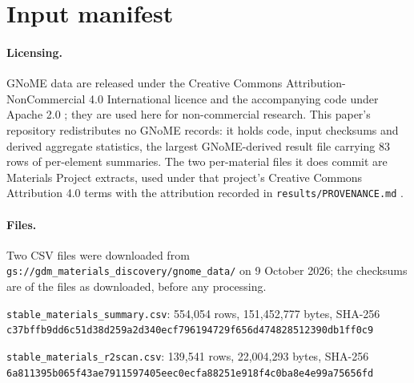 \documentclass[11pt]{article}
\begin{document}
\section{Input manifest}\label{app:manifest}

\paragraph{Licensing.} GNoME data are released under the Creative Commons
Attribution-NonCommercial 4.0 International licence and the accompanying code under
Apache 2.0 \citep{gnomedataset-s}; they are used here for non-commercial research. This
paper's repository redistributes no GNoME records: it holds code, input checksums and
derived aggregate statistics, the largest GNoME-derived result file carrying 83 rows of
per-element summaries. The two per-material files it does commit are Materials Project
extracts, used under that project's Creative Commons Attribution 4.0 terms with the
attribution recorded in \texttt{results/PROVENANCE.md} \citep{jain2013-s}.

\paragraph{Files.} Two CSV files were downloaded from
\texttt{gs://gdm\_materials\_discovery/gnome\_data/} on 9 October 2026; the checksums
are of the files as downloaded, before any processing.

\noindent\texttt{stable\_materials\_summary.csv}: 554{,}054 rows, 151{,}452{,}777 bytes, SHA-256\\
\texttt{c37bffb9dd6c51d38d259a2d340ecf796194729f656d474828512390db1ff0c9}

\noindent\texttt{stable\_materials\_r2scan.csv}: 139{,}541 rows, 22{,}004{,}293 bytes, SHA-256\\
\texttt{6a811395b065f43ae7911597405eec0ecfa88251e918f4c0ba8e4e99a75656fd}
\end{document}
